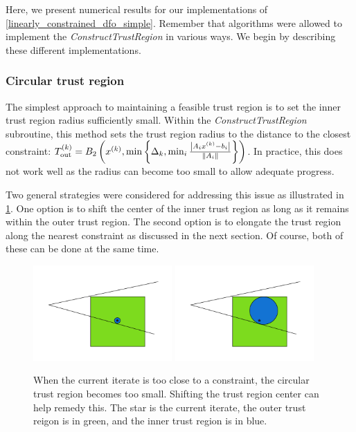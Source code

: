 Here, we present numerical results for our implementations of \cref{linearly_constrained_dfo_simple}.
Remember that algorithms were allowed to implement the \emph{ConstructTrustRegion} in various ways.
We begin by describing these different implementations.

\subsubsection{Circular trust region}

The simplest approach to maintaining a feasible trust region is to set the inner trust region radius sufficiently small.
Within the \emph{ConstructTrustRegion} subroutine, this method sets the trust region radius to the distance to the closest constraint:
${T_{\text{out}}^{(k)}} = B_2\left(x^{(k)}, \min\left\{\Delta_k, \min_{i}\frac{\left|A_ix^{(k)} - b_i\right|}{\left\|A_i\right\|} \right\}\right)$.
In practice, this does not work well as the radius can become too small to allow adequate progress.

Two general strategies were considered for addressing this issue as illustrated in \cref{options_basis}.
One option is to shift the center of the inner trust region as long as it remains within the outer trust region.
The second option is to elongate the trust region along the nearest constraint as discussed in the next section.
Of course, both of these can be done at the same time.


\begin{figure}[ht]
    \centering
    \includegraphics[width=200px]{images/small_circle.png}
    \includegraphics[width=200px]{images/shifted_center.png}
    \caption[The advantage of not requiring the sample region center to be the trust region center.]{
    	When the current iterate is too close to a constraint, the circular trust region becomes too small.
    	Shifting the trust region center can help remedy this.
    	The star is the current iterate, the outer trust reigon is in green, and the inner trust region is in blue.
    }
    \label{options_basis}
\end{figure}


